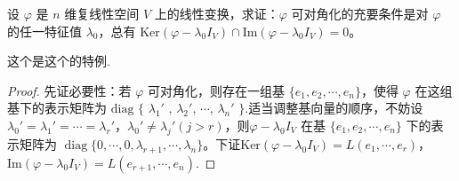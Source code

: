 \documentclass[../../main.tex]{subfiles}%
\begin{document}
\begin{proposition}\label{proposition:线性变换可对角化的几何充要条件1}
设 $\varphi$ 是 $n$ 维复线性空间 $V$ 上的线性变换，求证：$\varphi$ 可对角化的充要条件是对 $\varphi$ 的任一特征值 $\lambda_0$，总有 $\mathrm{Ker}(\varphi - \lambda_0I_V)\cap\mathrm{Im}(\varphi - \lambda_0I_V)=0$。
\end{proposition}
\begin{remark}
这个是这个的特例.
\end{remark}
\begin{proof}

{\heiti 先证必要性：}若 $\varphi$ 可对角化，则存在一组基 $\{e_1,e_2,\cdots,e_n\}$，使得 $\varphi$ 在这组基下的表示矩阵为 $\mathrm{diag}$ $\{$ $\lambda_1'$ , $\lambda_2'$, $\cdots$, $\lambda_n'$ $\}$.适当调整基向量的顺序，不妨设 $\lambda_0' = \lambda_1' = \cdots = \lambda_r'$，$\lambda_0'\neq\lambda_j' (j > r)$，则\(\varphi - \lambda_0 I_V\) 在基 \(\{e_1, e_2, \cdots, e_n\}\) 下的表示矩阵为 \(\operatorname{diag}\{0, \cdots, 0, \lambda_{r+1}, \cdots, \lambda_n\}\)。下证$\mathrm{Ker}(\varphi - \lambda_0I_V)=L(e_1,\cdots,e_r)$，$\mathrm{Im}(\varphi - \lambda_0I_V)=L(e_{r + 1},\cdots,e_n)$.


\end{proof}
\end{document}
